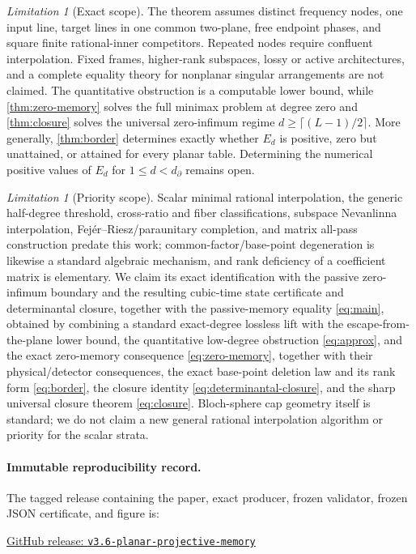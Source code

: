 \documentclass[11pt]{article}
\theoremstyle{definition}\newtheorem{definition}[theorem]{Definition}\newtheorem{example}[theorem]{Example}
\theoremstyle{remark}\newtheorem{remark}[theorem]{Remark}\newtheorem{limitation}[theorem]{Limitation}
\begin{document}
\begin{limitation}[Exact scope]
The theorem assumes distinct frequency nodes, one input line, target lines in
one common two-plane, free endpoint phases, and square finite rational-inner
competitors.  Repeated nodes require confluent interpolation.  Fixed frames,
higher-rank subspaces, lossy or active architectures, and a complete equality
theory for nonplanar singular arrangements are not claimed.  The quantitative
obstruction is a computable lower bound, while \cref{thm:zero-memory} solves the
full minimax problem at degree zero and \cref{thm:closure} solves the universal
zero-infimum regime $d\ge\lceil(L-1)/2\rceil$.  More generally,
\cref{thm:border} determines exactly whether $E_d$ is positive, zero but
unattained, or attained for every planar table.  Determining the numerical
positive values of $E_d$ for $1\le d<d_\partial$ remains open.
\end{limitation}

\begin{limitation}[Priority scope]
Scalar minimal rational interpolation, the generic half-degree threshold,
cross-ratio and fiber classifications, subspace Nevanlinna interpolation,
Fej\'er--Riesz/paraunitary completion, and matrix all-pass construction predate
this work; common-factor/base-point degeneration is likewise a standard
algebraic mechanism, and rank deficiency of a coefficient matrix is elementary.
We claim its exact identification with the passive zero-infimum boundary and
the resulting cubic-time state certificate and determinantal closure, together
with the passive-memory
equality \eqref{eq:main}, obtained by
combining a standard exact-degree lossless lift with the escape-from-the-plane
lower bound, the quantitative low-degree obstruction \eqref{eq:approx}, and
the exact zero-memory consequence \eqref{eq:zero-memory}, together with their
physical/detector consequences, the exact base-point deletion law
and its rank form \eqref{eq:border}, the closure identity
\eqref{eq:determinantal-closure}, and the sharp universal closure theorem
\eqref{eq:closure}.  Bloch-sphere cap geometry itself is standard;
we do not claim a new
general rational interpolation algorithm or priority for the scalar strata.
\end{limitation}

\paragraph{Immutable reproducibility record.}
The tagged release containing the paper, exact producer, frozen validator,
frozen JSON certificate, and figure is:
\begin{center}\small
\href{https://github.com/lluiseriksson/finite-sample-spectral-certificates/releases/tag/v3.6-planar-projective-memory}{GitHub release: \texttt{v3.6-planar-projective-memory}}
\end{center}
\end{document}
